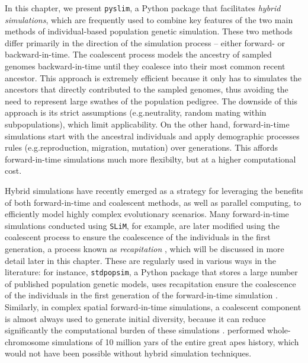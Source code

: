 \documentclass[12pt]{article}
\newcommand{\slim}[0]{\texttt{SLiM}\xspace}
\newcommand{\pyslim}[0]{\texttt{pyslim}\xspace}
\newcommand{\stdpopsim}[0]{\texttt{stdpopsim}\xspace}
\newcommand*{\eg}{e.g.\xcomma}
\begin{document}
In this chapter, we present \pyslim, a Python package that facilitates \emph{hybrid simulations},
which are frequently used to combine key features of the two main methods of individual-based population genetic simulation.
These two methods differ primarily in the direction of the simulation
process -- either forward- or backward-in-time. 
The coalescent process models the ancestry of sampled genomes
backward-in-time until they coalesce into their most common recent ancestor. %
This approach is extremely efficient because it only has to simulates the ancestors that directly contributed to the sampled genomes,
thus avoiding the need to represent large swathes of the population pedigree. 
The downside of this approach is its strict assumptions (\eg neutrality, random mating within subpopulations), 
which limit applicability.
On the other hand, forward-in-time simulations start with the ancestral individuals and apply demographic processes rules (\eg reproduction, migration, mutation) over generations.
This affords forward-in-time simulations much more flexibilty,
but at a higher computational cost.

Hybrid simulations have recently emerged as a strategy for leveraging the benefits of both forward-in-time and coalescent methods, as well as parallel computing,
to efficiently model highly complex evolutionary scenarios.
Many forward-in-time simulations conducted using \slim, for example, are later modified using the coalescent process to ensure the coalescence of the individuals in the first generation, a process known as \emph{recapitation} \citep{haller_tree-sequence_2019}, which will be discussed in more detail later in this chapter.
These are regularly used in various ways in the literature:
for instance, \stdpopsim, a Python package that stores a large number of published population genetic models,
uses recapitation ensure the coalescence of the individuals in the first generation of the forward-in-time simulation \citep{adrion_community-maintained_2020,elise_expanding_nodate,gower_accessible_2025}.
Similarly, in complex spatial forward-in-time simulations, a coalescent component is almost always used to generate initial diversity,
because it can reduce significantly the computational burden of these simulations \citep{battey_space_2020,petr_slendr_2023}.
\citet{rodrigues_shared_2024} performed whole-chromosome simulations of 10 million yars of the entire great apes history,
which would not have been possible without hybrid simulation techniques.
\end{document}

